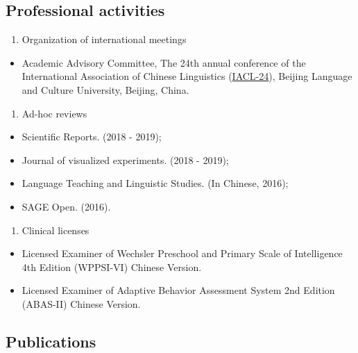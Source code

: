 \documentclass[12pt,]{article}
\providecommand{\tightlist}{%
  \setlength{\itemsep}{0pt}\setlength{\parskip}{0pt}}
\begin{document}
\hypertarget{professional-activities}{%
\subsection{Professional activities}\label{professional-activities}}

\begin{enumerate}
\def\labelenumi{\arabic{enumi}.}
\tightlist
\item
  Organization of international meetings
\end{enumerate}

\begin{itemize}
\tightlist
\item
  Academic Advisory Committee, The 24th annual conference of the
  International Association of Chinese Linguistics
  (\href{http://iacl24.blcu.edu.cn}{IACL-24}), Beijing Language and
  Culture University, Beijing, China.
\end{itemize}

\begin{enumerate}
\def\labelenumi{\arabic{enumi}.}
\setcounter{enumi}{1}
\tightlist
\item
  Ad-hoc reviews
\end{enumerate}

\begin{itemize}
\tightlist
\item
  Scientific Reports. (2018 - 2019);
\item
  Journal of visualized experiments. (2018 - 2019);
\item
  Language Teaching and Linguistic Studies. (In Chinese, 2016);
\item
  SAGE Open. (2016).
\end{itemize}

\begin{enumerate}
\def\labelenumi{\arabic{enumi}.}
\setcounter{enumi}{2}
\tightlist
\item
  Clinical licenses
\end{enumerate}

\begin{itemize}
\item
  Licensed Examiner of Wechsler Preschool and Primary Scale of
  Intelligence 4th Edition (WPPSI-VI) Chinese Version.
\item
  Licensed Examiner of Adaptive Behavior Assessment System 2nd Edition
  (ABAS-II) Chinese Version.
\end{itemize}

\hypertarget{publications}{%
\subsection{Publications}\label{publications}}
\end{document}
